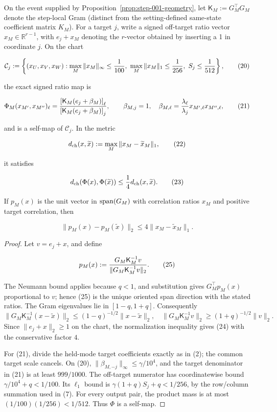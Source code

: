 \begin{lemma}\label{lem:step-004-chart}
On the event supplied by Proposition~\ref{prop:step-001-geometry}, let
\(\mathsf K_M:=G_M^\top G_M\) denote the step-local Gram (distinct from the
setting-defined same-state coefficient matrix \(K_M\)).
For a target \(j\), write a signed off-target ratio vector
\(x_M\in\mathbb R^{r-1}\), with \(e_j+x_M\) denoting the \(r\)-vector obtained by inserting a
1 in coordinate \(j\). On the chart

\[
\mathcal C_j:=\left\{(x_U,x_V,x_W):
\max_M\|x_M\|_\infty\le {1\over100},\
\max_M\|x_M\|_1\le {1\over256},\
S_j\le {1\over512}\right\},
\tag{20}
\]

the exact signed ratio map is

\[
\Phi_M(x_{M'},x_{M''})_\ell
={\left[\mathsf K_M(e_j+\beta_M)\right]_\ell\over
\left[\mathsf K_M(e_j+\beta_M)\right]_j},\qquad
\beta_{M,j}=1,\quad
\beta_{M,\ell}={\lambda_\ell\over\lambda_j}
x_{M',\ell}x_{M'',\ell},
\tag{21}
\]

and is a self-map of \(\mathcal C_j\). In the metric

\[
d_{\rm ch}(x,\widetilde x):=\max_M\|x_M-\widetilde x_M\|_1,
\tag{22}
\]

it satisfies

\[
d_{\rm ch}(\Phi(x),\Phi(\widetilde x))\le {1\over4}
d_{\rm ch}(x,\widetilde x).
\tag{23}
\]

If \(p_M(x)\) is the unit vector in \({\rm span}(G_M)\) with correlation
ratios \(x_M\) and positive target correlation, then

\[
\|p_M(x)-p_M(\widetilde x)\|_2\le4\|x_M-\widetilde x_M\|_1.
\tag{24}
\]

\begin{proof}
Let \(v=e_j+x\), and define

\[
p_M(x):={G_M\mathsf K_M^{-1}v\over
\|G_M\mathsf K_M^{-1}v\|_2}.
\tag{25}
\]

The Neumann bound applies because \(q<1\), and substitution gives
\(G_M^\top p_M(x)\) proportional to \(v\); hence (25) is the unique oriented
span direction with the stated ratios. The Gram eigenvalues lie in
\([1-q,1+q]\). Consequently
\[
\|G_M\mathsf K_M^{-1}(x-\widetilde x)\|_2
\le(1-q)^{-1/2}\|x-\widetilde x\|_2,
\quad
\|G_M\mathsf K_M^{-1}v\|_2\ge(1+q)^{-1/2}\|v\|_2.
\]
Since \(\|e_j+x\|_2\ge1\) on the chart, the normalization inequality gives
(24) with the conservative factor \(4\).

For (21), divide the held-mode target coefficients exactly as in (2); the
common target scale cancels. On (20),
\(\|\beta_{M,-j}\|_\infty\le\gamma/10^4\), and the target denominator in
(21) is at least \(999/1000\). The off-target numerator has coordinatewise
bound \(\gamma/10^4+q<1/100\). Its \(\ell_1\) bound is
\(\gamma(1+q)S_j+q<1/256\), by the row/column summation used in (7).
For every output pair, the product mass is at most
\((1/100)(1/256)<1/512\). Thus \(\Phi\) is a self-map.


\end{proof}
\end{lemma}
